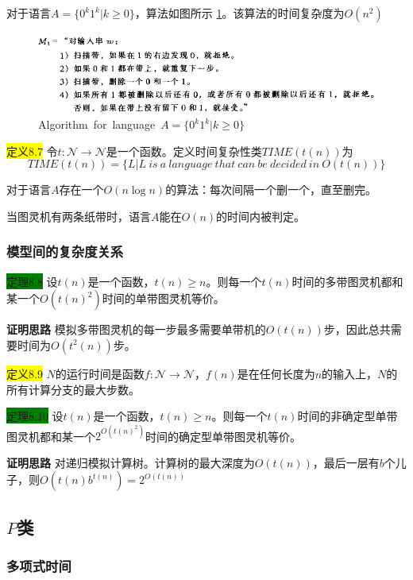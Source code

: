 \documentclass[a4paper]{article}
\begin{document}
	对于语言$A=\{0^k1^k|k \geq 0\}$，算法如图所示 \ref{F080102}。该算法的时间复杂度为$O(n^2)$
	
	\begin{figure}[htb]
		\centering
		\includegraphics[scale=0.8]{./figure/8.1.2.png}
		\caption{Algorithm~for~language~$A=\{0^k1^k|k \geq 0\}$}
		\label{F080102}
   \end{figure} 
   
   \colorbox{yellow}{定义8.7} 令$t:\mathcal{N} \rightarrow \mathcal{N}$是一个函数。定义时间复杂性类$TIME(t(n))$为
   $$TIME(t(n))=\{L|L~is~a~language~that~can~be~decided~in~O(t(n))\}$$

	对于语言$A$存在一个$O(n\log{n})$的算法：每次间隔一个删一个，直至删完。
	
	当图灵机有两条纸带时，语言$A$能在$O(n)$的时间内被判定。
   
\subsubsection{模型间的复杂度关系}

	\colorbox{green}{定理8.8} 设$t(n)$是一个函数，$t(n) \geq n$。则每一个$t(n)$时间的多带图灵机都和某一个$O(t(n)^2)$时间的单带图灵机等价。
	
	\textbf{证明思路} \quad 模拟多带图灵机的每一步最多需要单带机的$O(t(n))$步，因此总共需要时间为$O(t^2(n))$步。

	\colorbox{yellow}{定义8.9} $N$的运行时间是函数$f:\mathcal{N} \rightarrow \mathcal{N}$，$f(n)$是在任何长度为$n$的输入上，$N$的所有计算分支的最大步数。
	
	\colorbox{green}{定理8.10} 设$t(n)$是一个函数，$t(n) \geq n$。则每一个$t(n)$时间的非确定型单带图灵机都和某一个$2^{O(t(n)^2)}$时间的确定型单带图灵机等价。
	
	\textbf{证明思路} \quad 对递归模拟计算树。计算树的最大深度为$O(t(n))$，最后一层有$b$个儿子，则$O(t(n)b^{t(n)})=2^{O(t(n))}$

\subsection{$P$类}

\subsubsection{多项式时间}
\end{document}
